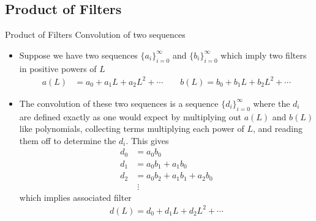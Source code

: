 \documentclass[aspectratio=169, handout]{beamer}
\begin{document}




\subsection{Product of Filters}

{\scriptsize
\begin{frame}{Product of Filters}
Convolution of two sequences
\begin{itemize}
  \item Suppose we have two sequences $\{a_i\}_{i=0}^\infty$ and
    $\{b_i\}_{i=0}^\infty$ which imply two filters
    in positive powers of $L$
    \begin{align*}
      a(L) &= a_0 + a_1 L + a_2 L^2 + \cdots
      \qquad
      b(L) = b_0 + b_1 L + b_2 L^2 + \cdots
    \end{align*}

  \pause
  \item The \alert{convolution} of these two sequences is a sequence
    $\{d_i\}_{i=0}^\infty$ where the $d_i$ are defined exactly as one
    would expect by multiplying out $a(L)$ and $b(L)$ like polynomials,
    collecting terms multiplying each power of $L$, and reading them off
    to determine the $d_i$.
    This gives
    \begin{align*}
      d_0 &= a_0b_0 \\
      d_1 &= a_0 b_1 + a_1 b_0 \\
      d_2 &= a_0 b_2 + a_1 b_1 + a_2 b_0 \\
      &\;\vdots
    \end{align*}
    \pause
    which implies associated filter
    \begin{align*}
      d(L) = d_0 + d_1 L + d_2 L^2 + \cdots
    \end{align*}
\end{itemize}
\end{frame}
}
\end{document}
